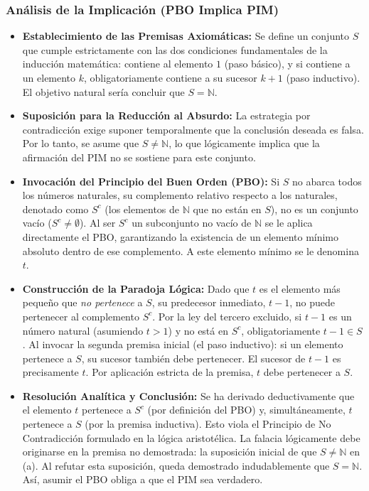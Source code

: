 \documentclass{article}
\begin{document}
\subsubsection{Análisis de la Implicación (PBO Implica PIM)}
\label{sec:analisis-pbo-pim}

\begin{itemize}
    \item \textbf{Establecimiento de las Premisas Axiomáticas:} Se define un conjunto $S$ que cumple estrictamente con las dos condiciones fundamentales de la inducción matemática: contiene al elemento $1$ (paso básico), y si contiene a un elemento $k$, obligatoriamente contiene a su sucesor $k+1$ (paso inductivo). El objetivo natural sería concluir que $S = \mathbb{N}$.
    \item \textbf{Suposición para la Reducción al Absurdo:} La estrategia por contradicción exige suponer temporalmente que la conclusión deseada es falsa. Por lo tanto, se asume que $S \neq \mathbb{N}$, lo que lógicamente implica que la afirmación del PIM no se sostiene para este conjunto.
    \item \textbf{Invocación del Principio del Buen Orden (PBO):} Si $S$ no abarca todos los números naturales, su complemento relativo respecto a los naturales, denotado como $S^c$ (los elementos de $\mathbb{N}$ que no están en $S$), no es un conjunto vacío ($S^c \neq \emptyset$). Al ser $S^c$ un subconjunto no vacío de $\mathbb{N}$ se le aplica directamente el PBO, garantizando la existencia de un elemento mínimo absoluto dentro de ese complemento. A este elemento mínimo se le denomina $t$.
    \item \textbf{Construcción de la Paradoja Lógica:} Dado que $t$ es el elemento más pequeño que \textit{no pertenece} a $S$, su predecesor inmediato, $t-1$, no puede pertenecer al complemento $S^c$. Por la ley del tercero excluido, si $t-1$ es un número natural (asumiendo $t > 1$) y no está en $S^c$, obligatoriamente $t-1 \in S$. Al invocar la segunda premisa inicial (el paso inductivo): si un elemento pertenece a $S$, su sucesor también debe pertenecer. El sucesor de $t-1$ es precisamente $t$. Por aplicación estricta de la premisa, $t$ debe pertenecer a $S$.
    \item \textbf{Resolución Analítica y Conclusión:} Se ha derivado deductivamente que el elemento $t$ pertenece a $S^c$ (por definición del PBO) y, simultáneamente, $t$ pertenece a $S$ (por la premisa inductiva). Esto viola el Principio de No Contradicción formulado en la lógica aristotélica. La falacia lógicamente debe originarse en la premisa no demostrada: la suposición inicial de que $S \neq \mathbb{N}$ en (a). Al refutar esta suposición, queda demostrado indudablemente que $S = \mathbb{N}$. Así, asumir el PBO obliga a que el PIM sea verdadero.
\end{itemize}
\end{document}
